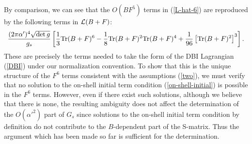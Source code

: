 \documentclass[a4paper,12pt]{article}
\begin{document}
By comparison, we can see that
the $O(BF^5)$ terms in (\ref{L-hat-6}) are reproduced by
the following terms in ${\cal L}(B+F)$:
\begin{equation}
\frac{(2 \pi \alpha')^4 \sqrt{\det g}}{g_s} \left[
\frac{1}{3} {\rm Tr} (B+F)^6
- \frac{1}{8} {\rm Tr} (B+F)^2 {\rm Tr} (B+F)^4
+ \frac{1}{96} \left[ {\rm Tr} (B+F)^2 \right]^3
\right].
\label{(B+F)^6}
\end{equation}
These are precisely the terms needed to take the form of
the DBI Lagrangian (\ref{DBI}) under our normalization convention.
To show that this is the unique structure of the $F^6$ terms
consistent with the assumptions (\ref{two}),
we must verify that no solution to
the on-shell initial term condition (\ref{on-shell-initial})
is possible in the $F^6$ terms.
However, even if there exist such solutions,
although we believe that there is none,
the resulting ambiguity does not affect
the determination of the $O(\alpha'^2)$ part of $G_s$
since solutions to the on-shell initial term condition
by definition
do not contribute to the $B$-dependent part of the S-matrix.
Thus the argument which has been made so far is
sufficient for the determination.
\end{document}
